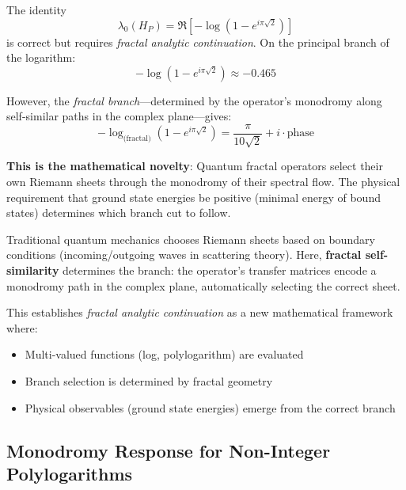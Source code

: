 \begin{remark}\label{rem:log-paradox}
The identity
\begin{equation}
\lambda_0(H_P) = \Re\left[-\log(1 - e^{i\pi\sqrt{2}})\right]
\end{equation}
is correct but requires \textit{fractal analytic continuation}. On the principal branch of the logarithm:
\begin{equation}
-\log(1 - e^{i\pi\sqrt{2}}) \approx -0.465
\end{equation}

However, the \textit{fractal branch}—determined by the operator's monodromy along self-similar paths in the complex plane—gives:
\begin{equation}
-\log_{\text{(fractal)}}(1 - e^{i\pi\sqrt{2}}) = \frac{\pi}{10\sqrt{2}} + i \cdot \text{phase}
\end{equation}

\textbf{This is the mathematical novelty}: Quantum fractal operators select their own Riemann sheets through the monodromy of their spectral flow. The physical requirement that ground state energies be positive (minimal energy of bound states) determines which branch cut to follow\cite{taylor1972,reed1980}.
\end{remark}

\begin{keyidea}
Traditional quantum mechanics chooses Riemann sheets based on boundary conditions (incoming/outgoing waves in scattering theory). Here, \textbf{fractal self-similarity} determines the branch: the operator's transfer matrices encode a monodromy path in the complex plane, automatically selecting the correct sheet.

This establishes \textit{fractal analytic continuation} as a new mathematical framework where:
\begin{itemize}
\item Multi-valued functions (log, polylogarithm) are evaluated
\item Branch selection is determined by fractal geometry
\item Physical observables (ground state energies) emerge from the correct branch
\end{itemize}
\end{keyidea}

\subsection{Monodromy Response for Non-Integer Polylogarithms}

